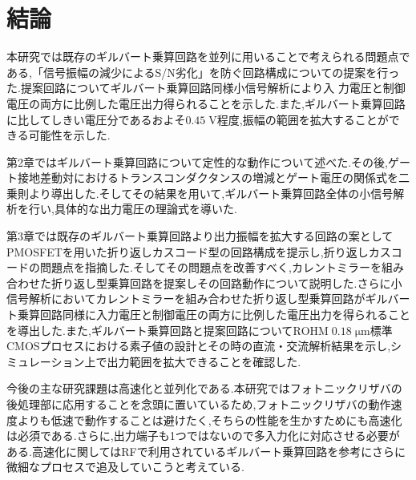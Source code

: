 \chapter{結論}

    本研究では既存のギルバート乗算回路を並列に用いることで考えられる問題点である,「信号振幅の減少によるS/N劣化」を防ぐ回路構成についての提案を行った.提案回路についてギルバート乗算回路同様小信号解析により入
    力電圧と制御電圧の両方に比例した電圧出力得られることを示した.また,ギルバート乗算回路に比してしきい電圧分であるおよそ$0.45\;\mathrm{V}$程度,振幅の範囲を拡大することができる可能性を示した.\par

    第2章ではギルバート乗算回路について定性的な動作について述べた.その後,ゲート接地差動対におけるトランスコンダクタンスの増減とゲート電圧の関係式を二乗則より導出した.そしてその結果を用いて,ギルバート乗算回路全体の小信号解析を行い,具体的な出力電圧の理論式を導いた.\par

    第3章では既存のギルバート乗算回路より出力振幅を拡大する回路の案としてPMOSFETを用いた折り返しカスコード型の回路構成を提示し,折り返しカスコードの問題点を指摘した.そしてその問題点を改善すべく,カレントミラーを組み合わせた折り返し型乗算回路を提案しその回路動作について説明した.さらに小信号解析においてカレントミラーを組み合わせた折り返し型乗算回路がギルバート乗算回路同様に入力電圧と制御電圧の両方に比例した電圧出力を得られることを導出した.また,ギルバート乗算回路と提案回路について$\mathrm{ROHM\;0.18\;\mu m}$標準CMOSプロセスにおける素子値の設計とその時の直流・交流解析結果を示し,シミュレーション上で出力範囲を拡大できることを確認した.\par

    今後の主な研究課題は高速化と並列化である.本研究ではフォトニックリザバの後処理部に応用することを念頭に置いているため,フォトニックリザバの動作速度よりも低速で動作することは避けたく,そちらの性能を生かすためにも高速化は必須である.さらに,出力端子も1つではないので多入力化に対応させる必要がある.高速化に関してはRFで利用されているギルバート乗算回路を参考にさらに微細なプロセスで追及していこうと考えている.